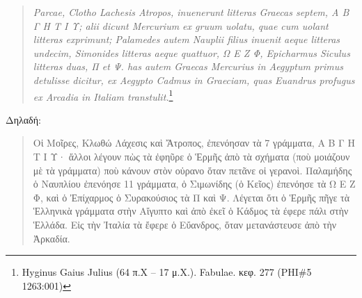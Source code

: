 \documentclass[12pt,a4paper]{article}
\begin{document}
  \begin{quotation}
    \noindent
    \textit{
          Parcae, Clotho Lachesis Atropos, inuenerunt litteras Graecas
          septem, Α Β Γ Η Τ Ι Υ; alii dicunt Mercurium ex gruum uolatu,
          quae cum uolant litteras exprimunt; Palamedes autem Nauplii
          filius inuenit aeque litteras undecim, Simonides
          litteras aeque quattuor, Ω Ε Ζ Φ, Epicharmus Siculus
          litteras duas, Π et Ψ. has autem Graecas Mercurius in 
          Aegyptum primus detulisse dicitur, ex Aegypto Cadmus in Graeciam, 
          quas Euandrus profugus ex Arcadia in Italiam
        transtulit.}\footnote{Hyginus Gaius Julius (64 π.Χ – 17 μ.Χ.).
          Fabulae. κεφ. 277 (PHI\#5 1263:001) } 
  \end{quotation}    

   Δηλαδή:

  \begin{quotation}
    \noindent
         Οἱ Μοῖρες, Κλωθώ Λάχεσις καὶ Ἄτροπος, ἐπενόησαν τὰ 7 γράμματα,
         Α Β Γ Η Τ Ι Υ· ἄλλοι λέγουν πὼς τὰ ἐφηῦρε ὁ Ἑρμῆς ἀπὸ τὰ σχήματα
         (ποὺ μοιάζουν μὲ τὰ γράμματα) ποὺ κάνουν στὸν οὐρανο ὅταν πετᾶνε 
         οἱ γερανοὶ.
         Παλαμήδης ὁ Ναυπλίου ἐπενόησε 11 γράμματα, ὁ Σιμωνίδης (ὁ Κεῖος)
         ἐπενόησε τὰ Ω Ε Ζ Φ, καὶ ὁ Ἐπίχαρμος ὁ Συρακούσιος τὰ Π καὶ Ψ.
         Λέγεται ὅτι ὁ Ἑρμῆς πῆγε τὰ Ἑλληνικὰ γράμματα στὴν Αἴγυπτο καὶ 
         ἀπὸ ἐκεῖ ὁ Κάδμος τὰ έφερε πάλι στὴν Ἑλλάδα. Εἰς τὴν Ἰταλία 
         τὰ ἔφερε ὁ Εὔανδρος, ὅταν μετανάστευσε ἀπὸ τὴν Ἀρκαδία.
  \end{quotation}    
  \newpage
\end{document}
